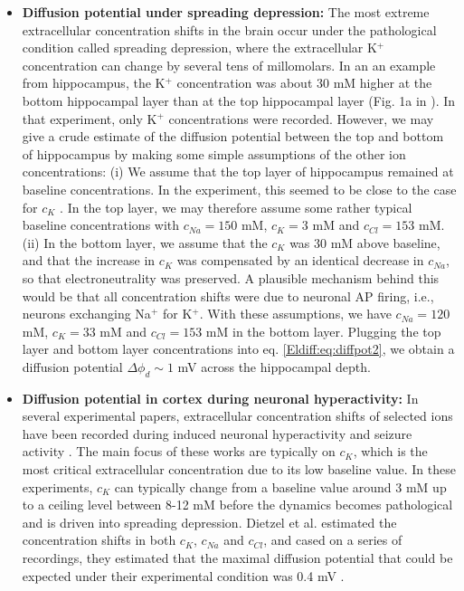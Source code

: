 \begin{itemize}

\item {\bf Diffusion potential under spreading depression:} The most extreme extracellular concentration shifts in the brain occur under the pathological condition called spreading depression, where the extracellular K$^+$ concentration can change by several tens of millomolars. In an an example from hippocampus, the K$^+$ concentration was about 30 mM higher at the bottom hippocampal layer than at the top hippocampal layer (Fig. 1a in \cite{Herreras1993}). In that experiment, only K$^+$ concentrations were recorded. However, we may give a crude estimate of the diffusion potential between the top and bottom of hippocampus by making some simple assumptions of the other ion concentrations: (i) We assume that the top layer of hippocampus remained at baseline concentrations. In the experiment, this seemed to be close to the case for $c_K$ \cite{Herreras1993}. In the top layer, we may therefore assume some rather typical baseline concentrations with $c_{Na} = 150$ mM, $c_{K} = 3$ mM and $c_{Cl} = 153$ mM. (ii) In the bottom layer, we assume that the $c_K$ was 30 mM above baseline, and that the increase in $c_K$ was compensated by an identical decrease in $c_{Na}$, so that electroneutrality was preserved. A plausible mechanism behind this would be that all concentration shifts were due to neuronal AP firing, i.e., neurons exchanging Na$^+$ for K$^+$. With these assumptions, we have $c_{Na} = 120$ mM, $c_{K} = 33$ mM and $c_{Cl} = 153$ mM in the bottom layer. Plugging the top layer and bottom layer concentrations into eq. \ref{Eldiff:eq:diffpot2}, we obtain a diffusion potential $\Delta \phi_d \sim 1$ mV across the hippocampal depth.

\item {\bf Diffusion potential in cortex during neuronal hyperactivity:} In several experimental papers, extracellular concentration shifts of selected ions have been recorded during induced neuronal hyperactivity and seizure activity \cite{kriv1975, nicholson1978, Dietzel1982, somjen1986, Dietzel1989}. The main focus of these works are typically on $c_K$, which is the most critical extracellular concentration due to its low baseline value. In these experiments, $c_K$ can typically change from a baseline value around 3 mM up to a ceiling level between 8-12 mM before the dynamics becomes pathological and is driven into spreading depression. Dietzel et al. estimated the concentration shifts in both $c_{K}$, $c_{Na}$ and $c_{Cl}$, and cased on a series of recordings, they estimated that the maximal diffusion potential that could be expected under their experimental condition was 0.4 mV \cite{Dietzel1989}.


\end{itemize}
